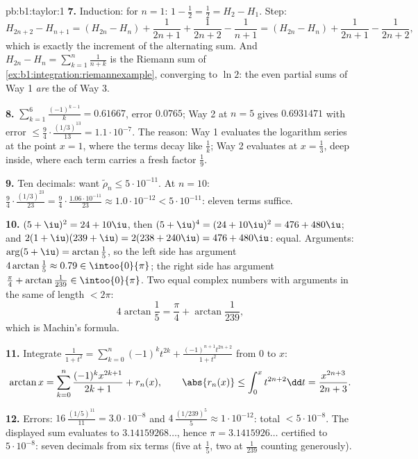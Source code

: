 \begin{solution}{pb:b1:taylor:1}
\textbf{7.} Induction: for $n = 1$: $1 - \frac12 = \frac12 = H_2
- H_1$. Step:
\[
H_{2n+2} - H_{n+1} = (H_{2n} - H_n) + \frac{1}{2n+1} +
\frac{1}{2n+2} - \frac{1}{n+1}
= (H_{2n} - H_n) + \frac{1}{2n+1} - \frac{1}{2n+2},
\]
which is exactly the increment of the alternating sum. And
$H_{2n} - H_n = \sum_{k=1}^{n}\frac{1}{n+k}$ is the Riemann sum
of \cref{ex:b1:integration:riemannexample}, converging to $\ln
2$: the even partial sums of Way 1 \emph{are} the 
of Way 3.

\textbf{8.} $\sum_{k=1}^{6}\frac{(-1)^{k-1}}{k} = 0.61667$,
error $0.0765$; Way 2 at $n = 5$ gives $0.6931471$ with error
$\leq \frac94\cdot\frac{(1/3)^{13}}{13} = 1.1\cdot10^{-7}$. The
reason: Way 1 evaluates the logarithm series at the 
point $x = 1$, where the terms decay like $\frac1k$; Way 2
evaluates at $x = \frac13$, deep inside, where each term carries
a fresh factor $\frac19$.

\textbf{9.} Ten decimals: want $\tilde\rho_n \leq
5\cdot10^{-11}$. At $n = 10$: $\frac94 \cdot
\frac{(1/3)^{23}}{23} = \frac94\cdot\frac{1.06\cdot10^{-11}}{23}
\approx 1.0\cdot10^{-12} < 5\cdot10^{-11}$: eleven terms
suffice.

\textbf{10.} $(5+\iu)^2 = 24 + 10\iu$, then $(5+\iu)^4 = (24 +
10\iu)^2 = 476 + 480\iu$; and $2(1+\iu)(239+\iu) = 2(238 +
240\iu) = 476 + 480\iu$: equal. Arguments: $\arg(5 + \iu) =
\arctan\frac15$, so the left side has argument
$4\arctan\frac15 \approx 0.79 \in \intoo{0}{\pi}$; the right
side has argument $\frac\pi4 + \arctan\frac{1}{239} \in
\intoo{0}{\pi}$. Two equal complex numbers with arguments in the
same  of length $< 2\pi$:
\[
4\arctan\frac15 = \frac\pi4 + \arctan\frac{1}{239} ,
\]
which is Machin's formula.

\textbf{11.} Integrate $\frac{1}{1+t^2} = \sum_{k=0}^n (-1)^k
t^{2k} + \frac{(-1)^{n+1}t^{2n+2}}{1+t^2}$ from $0$ to $x$:
\[
\arctan x = \sum_{k=0}^{n}\frac{(-1)^k x^{2k+1}}{2k+1} +
r_n(x),
\qquad
\abs{r_n(x)} \leq \int_0^x t^{2n+2}\dd t =
\frac{x^{2n+3}}{2n+3} .
\]

\textbf{12.} Errors: $16\,\frac{(1/5)^{11}}{11} = 3.0\cdot
10^{-8}$ and $4\,\frac{(1/239)^5}{5} \approx 1\cdot10^{-12}$:
total $< 5\cdot10^{-8}$. The displayed sum evaluates to
$3.14159268\dots$, hence $\pi = 3.1415926\dots$ certified to
$5\cdot10^{-8}$: seven decimals from six terms (five at
$\frac15$, two at $\frac1{239}$ counting generously).


\end{solution}
